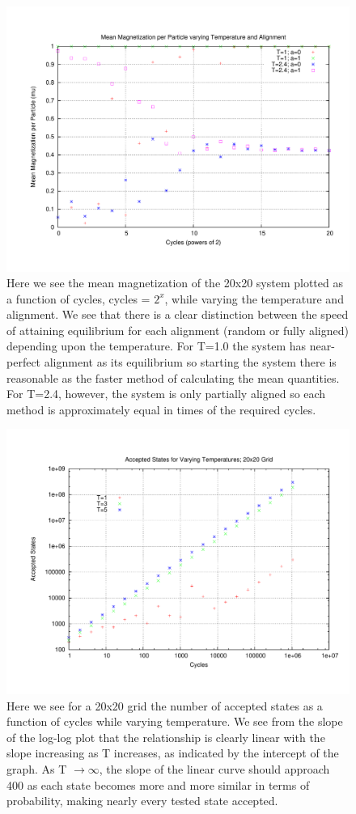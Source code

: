 \documentclass[11pt,a4paper]{article}
\begin{document}
\begin{figure}
\centering
\includegraphics[width=1.0\textwidth]{n20_meanmag.pdf}
\caption{Here we see the mean magnetization of the 20x20 system plotted as a function of cycles, cycles = $2^x$, while varying the temperature and alignment. We see that there is a clear distinction between the speed of attaining equilibrium for each alignment (random or fully aligned) depending upon the temperature. For T=1.0 the system has near-perfect alignment as its equilibrium so starting the system there is reasonable as the faster method of calculating the mean quantities. For T=2.4, however, the system is only partially aligned so each method is approximately equal in times of the required cycles.}
\end{figure}
\begin{figure}
\centering
\includegraphics[width=1.0\textwidth]{accstates_loglog.pdf}
\caption{Here we see for a 20x20 grid the number of accepted states as a function of cycles while varying temperature. We see from the slope of the log-log plot that the relationship is clearly linear with the slope increasing as T increases, as indicated by the intercept of the graph. As T $\rightarrow \infty$, the slope of the linear curve should approach 400 as each state becomes more and more similar in terms of probability, making nearly every tested state accepted.}
\end{figure}
\end{document}
